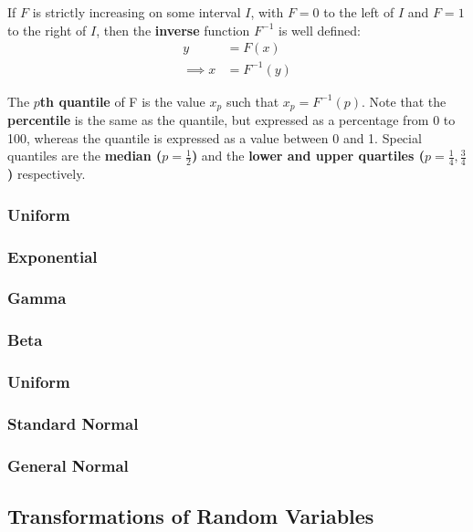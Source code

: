 \documentclass[a4paper,10pt]{article}
\begin{document}
If $F$ is strictly increasing on some interval $I$, with $F=0$ to the left of $I$ and $F=1$ to the right of $I$, then the \textbf{inverse} function $F^{-1}$ is well defined:
\begin{align*}
    y&=F(x) \\
    \implies x&=F^{-1}(y)
\end{align*}

The \textbf{$p$th quantile} of F is the value $x_p$ such that $x_p = F^{-1}(p)$. Note that the \textbf{percentile} is the same as the quantile, but expressed as a percentage from 0 to 100, whereas the quantile is expressed as a value between 0 and 1. Special quantiles are the \textbf{median ($p=\frac{1}{2}$)} and the \textbf{lower and upper quartiles ($p=\frac{1}{4}, \frac{3}{4}$)} respectively. 

\subsubsection{Uniform}

\subsubsection{Exponential}

\subsubsection{Gamma}

\subsubsection{Beta}

\subsubsection{Uniform}

\subsubsection{Standard Normal}

\subsubsection{General Normal}

\subsection{Transformations of Random Variables}
\end{document}
